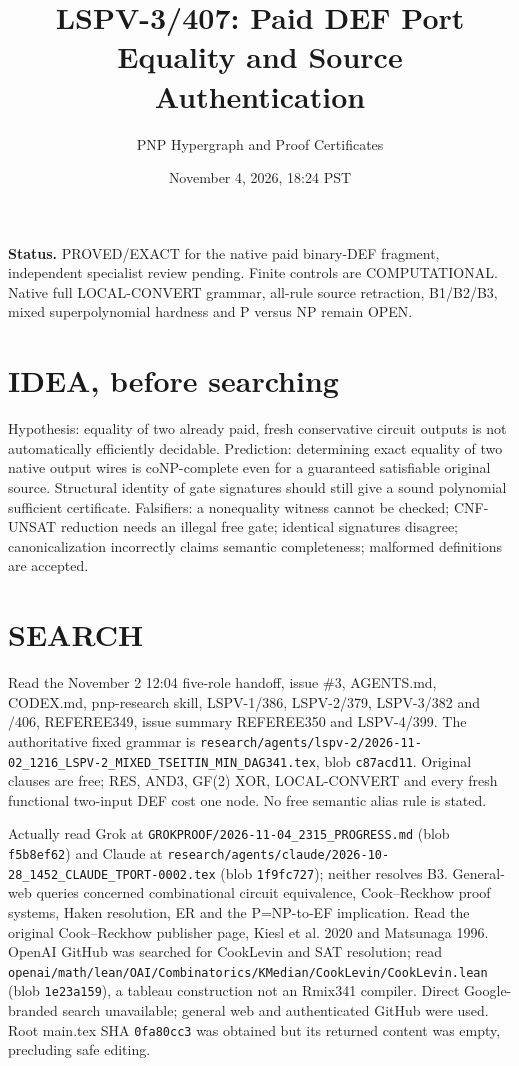\documentclass[11pt]{article}
\title{LSPV-3/407: Paid DEF Port Equality and Source Authentication}
\author{PNP Hypergraph and Proof Certificates}
\date{November 4, 2026, 18:24 PST}
\begin{document}
\maketitle
\noindent\textbf{Status.} PROVED/EXACT for the native paid binary-DEF fragment, independent specialist review pending. Finite controls are COMPUTATIONAL. Native full LOCAL-CONVERT grammar, all-rule source retraction, B1/B2/B3, mixed superpolynomial hardness and P versus NP remain OPEN.

\section*{IDEA, before searching}
Hypothesis: equality of two already paid, fresh conservative circuit outputs is not automatically efficiently decidable. Prediction: determining exact equality of two native output wires is coNP-complete even for a guaranteed satisfiable original source. Structural identity of gate signatures should still give a sound polynomial sufficient certificate. Falsifiers: a nonequality witness cannot be checked; CNF-UNSAT reduction needs an illegal free gate; identical signatures disagree; canonicalization incorrectly claims semantic completeness; malformed definitions are accepted.

\section*{SEARCH}
Read the November 2 12:04 five-role handoff, issue \#3, AGENTS.md, CODEX.md, pnp-research skill, LSPV-1/386, LSPV-2/379, LSPV-3/382 and /406, REFEREE349, issue summary REFEREE350 and LSPV-4/399. The authoritative fixed grammar is \texttt{research/agents/lspv-2/2026-11-02\_1216\_LSPV-2\_MIXED\_TSEITIN\_MIN\_DAG341.tex}, blob \texttt{c87acd11}. Original clauses are free; RES, AND3, GF(2) XOR, LOCAL-CONVERT and every fresh functional two-input DEF cost one node. No free semantic alias rule is stated.

Actually read Grok at \texttt{GROKPROOF/2026-11-04\_2315\_PROGRESS.md} (blob \texttt{f5b8ef62}) and Claude at \texttt{research/agents/claude/2026-10-28\_1452\_CLAUDE\_TPORT-0002.tex} (blob \texttt{1f9fc727}); neither resolves B3. General-web queries concerned combinational circuit equivalence, Cook--Reckhow proof systems, Haken resolution, ER and the P=NP-to-EF implication. Read the original Cook--Reckhow publisher page, Kiesl et al. 2020 and Matsunaga 1996. OpenAI GitHub was searched for CookLevin and SAT resolution; read \texttt{openai/math/lean/OAI/Combinatorics/KMedian/CookLevin/CookLevin.lean} (blob \texttt{1e23a159}), a tableau construction not an Rmix341 compiler. Direct Google-branded search unavailable; general web and authenticated GitHub were used. Root main.tex SHA \texttt{0fa80cc3} was obtained but its returned content was empty, precluding safe editing.
\end{document}

